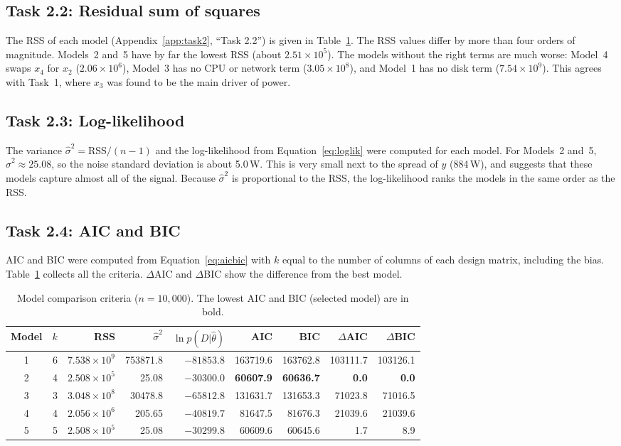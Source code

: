 \subsection{Task 2.2: Residual sum of squares}
The RSS of each model (Appendix~\ref{app:task2}, ``Task 2.2'') is given in Table~\ref{tab:crit}. The RSS values differ by more than four orders of magnitude. Models~2 and~5 have by far the lowest RSS (about $2.51\times10^5$). The models without the right terms are much worse: Model~4 swaps $x_4$ for $x_2$ ($2.06\times10^6$), Model~3 has no CPU or network term ($3.05\times10^8$), and Model~1 has no disk term ($7.54\times10^9$). This agrees with Task~1, where $x_3$ was found to be the main driver of power.

\subsection{Task 2.3: Log-likelihood}
The variance $\hat\sigma^2=\text{RSS}/(n-1)$ and the log-likelihood from Equation~\eqref{eq:loglik} were computed for each model. For Models~2 and~5, $\hat\sigma^2\approx25.08$, so the noise standard deviation is about 5.0\,W. This is very small next to the spread of $y$ (884\,W), and suggests that these models capture almost all of the signal. Because $\hat\sigma^2$ is proportional to the RSS, the log-likelihood ranks the models in the same order as the RSS.

\subsection{Task 2.4: AIC and BIC}
AIC and BIC were computed from Equation~\eqref{eq:aicbic} with $k$ equal to the number of columns of each design matrix, including the bias. Table~\ref{tab:crit} collects all the criteria. $\Delta$AIC and $\Delta$BIC show the difference from the best model.

\begin{table}[H]
\centering
\caption{Model comparison criteria ($n=10{,}000$). The lowest AIC and BIC (selected model) are in bold.}
\label{tab:crit}
\small
\setlength{\tabcolsep}{4pt}
\begin{tabular}{crrrrrrrr}
\toprule
Model & $k$ & RSS & $\hat\sigma^2$ & $\ln p(D|\hat\theta)$ & AIC & BIC & $\Delta$AIC & $\Delta$BIC \\
\midrule
1 & 6 & $7.538\times10^{9}$ & 753871.8 & $-81853.8$ & 163719.6 & 163762.8 & 103111.7 & 103126.1 \\
2 & 4 & $2.508\times10^{5}$ & 25.08 & $-30300.0$ & \textbf{60607.9} & \textbf{60636.7} & \textbf{0.0} & \textbf{0.0} \\
3 & 3 & $3.048\times10^{8}$ & 30478.8 & $-65812.8$ & 131631.7 & 131653.3 & 71023.8 & 71016.5 \\
4 & 4 & $2.056\times10^{6}$ & 205.65 & $-40819.7$ & 81647.5 & 81676.3 & 21039.6 & 21039.6 \\
5 & 5 & $2.508\times10^{5}$ & 25.08 & $-30299.8$ & 60609.6 & 60645.6 & 1.7 & 8.9 \\
\bottomrule
\end{tabular}
\end{table}

